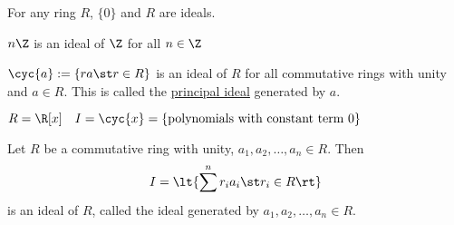 \begin{example}
  For any ring \( R \), \( \{0\} \) and \( R \) are ideals.
\end{example}

\begin{example}
  \( n\Z \) is an ideal of \( \Z \) for all \( n\in\Z \)
\end{example}

\begin{example}
  \( \cyc{a}:=\{ra\st r\in R\} \) is an ideal of \( R \) for all commutative rings with unity and \( a\in R \). This is called the \ul{principal ideal} generated by \( a \).
\end{example}

\begin{example}
  \( R=\R[x]\quad I=\cyc{x}= \{\text{polynomials with constant term 0}\} \)
\end{example}

\begin{example}
  Let \( R \) be a commutative ring with unity, \( a_1,a_2,\ldots,a_n\in R \). Then
  \begin{align*}
    I = \lt\{\sum^n  r_ia_i \st r_i\in R\rt\}
  \end{align*}
  is an ideal of \( R \), called the ideal generated by \( a_1,a_2,\ldots,a_n\in R \).
\end{example}
